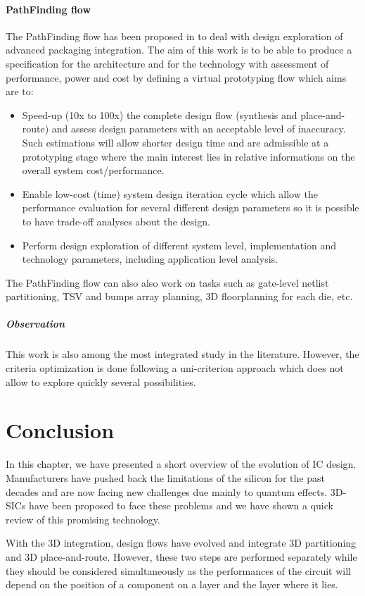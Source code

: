 \paragraph{PathFinding flow}
The PathFinding flow has been proposed in \cite{5335663,DBLP:conf/3dic/MilojevicCCRRSAPM09} to deal with design exploration of advanced packaging integration. The aim of this work is to be able to produce a specification for the architecture and for the technology with assessment of performance, power and cost by defining a virtual prototyping flow which aims are to:
\begin{itemize}
\item Speed-up (10x to 100x) the complete design flow (synthesis and place-and-route) and assess design parameters with an acceptable level of inaccuracy. Such estimations will allow shorter design time and are admissible at a prototyping stage where the main interest lies in relative informations on the overall system cost/performance.
\item Enable low-cost (time) system design iteration cycle which allow the performance evaluation for several different design parameters so it is possible to have trade-off analyses about the design.
\item Perform design exploration of different system level, implementation and technology parameters, including application level analysis.
\end{itemize}
The PathFinding flow can also also work on tasks such as gate-level netlist partitioning, TSV and bumps array planning, 3D floorplanning for each die, etc.

\subparagraph{Observation}
This work is also among the most integrated study in the literature. However, the criteria optimization is done following a uni-criterion approach which does not allow to explore quickly several possibilities.

\section{Conclusion}
In this chapter, we have presented a short overview of the evolution of IC design. Manufacturers have pushed back the limitations of the silicon for the past decades and are now facing new challenges due mainly to quantum effects. 3D-SICs have been proposed to face these problems and we have shown a quick review of this promising technology.

With the 3D integration, design flows have evolved and integrate 3D partitioning and 3D place-and-route. However, these two steps are performed separately while they should be considered simultaneously as the performances of the circuit will depend on the position of a component on a layer and the layer where it lies.

